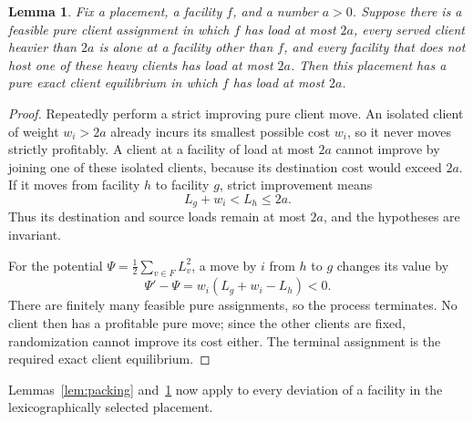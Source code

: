 \documentclass[11pt]{amsart}
\newtheorem{lemma}[theorem]{Lemma}
\theoremstyle{definition}
\begin{document}
\begin{lemma}\label{lem:capped}
Fix a placement, a facility $f$, and a number $a>0$. Suppose there is a feasible pure client assignment in which $f$ has load at most $2a$, every served client heavier than $2a$ is alone at a facility other than $f$, and every facility that does not host one of these heavy clients has load at most $2a$. Then this placement has a pure exact client equilibrium in which $f$ has load at most $2a$.
\end{lemma}
\begin{proof}
Repeatedly perform a strict improving pure client move. An isolated client of weight $w_i>2a$ already incurs its smallest possible cost $w_i$, so it never moves strictly profitably. A client at a facility of load at most $2a$ cannot improve by joining one of these isolated clients, because its destination cost would exceed $2a$. If it moves from facility $h$ to facility $g$, strict improvement means
\[
 L_g+w_i<L_h\le2a.
\]
Thus its destination and source loads remain at most $2a$, and the hypotheses are invariant.

For the potential $\Psi=\tfrac12\sum_{v\in F}L_v^2$, a move by $i$ from $h$ to $g$ changes its value by
\begin{equation}\label{eq:potential}
 \Psi'-\Psi=w_i(L_g+w_i-L_h)<0.
\end{equation}
There are finitely many feasible pure assignments, so the process terminates. No client then has a profitable pure move; since the other clients are fixed, randomization cannot improve its cost either. The terminal assignment is the required exact client equilibrium.
\end{proof}

Lemmas~\ref{lem:packing} and~\ref{lem:capped} now apply to every deviation of a facility in the lexicographically selected placement.
\end{document}
